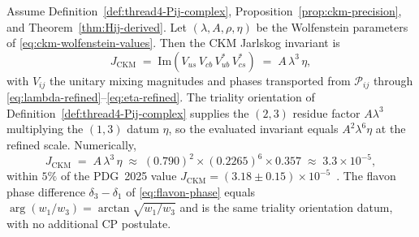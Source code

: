 \begin{theorem}
\label{thm:thread4-cp-phases}
Assume Definition~\ref{def:thread4-Pij-complex},
Proposition~\ref{prop:ckm-precision}, and Theorem~\ref{thm:Hij-derived}.
Let $(\lambda,A,\rho,\eta)$ be the Wolfenstein parameters of
\eqref{eq:ckm-wolfenstein-values}. Then the CKM Jarlskog invariant is
\begin{equation}\label{eq:thread4-jarlskog}
  J_{\mathrm{CKM}}
  \;=\;
  \mathrm{Im}\!\left(
    V_{us}\,V_{cb}\,V_{ub}^*\,V_{cs}^*
  \right)
  \;=\;
  A\,\lambda^3\,\eta,
\end{equation}
with $V_{ij}$ the unitary mixing magnitudes and phases transported from
$\mathcal{P}_{ij}$ through \eqref{eq:lambda-refined}--\eqref{eq:eta-refined}.
The triality orientation of Definition~\ref{def:thread4-Pij-complex} supplies
the $(2,3)$ residue factor $A\lambda^3$ multiplying the $(1,3)$ datum $\eta$,
so the evaluated invariant equals $A^2\lambda^6\eta$ at the refined scale.
Numerically,
\begin{equation}\label{eq:thread4-jarlskog-numeric}
  J_{\mathrm{CKM}}
  \;=\;
  A\,\lambda^3\,\eta
  \;\approx\;
  (0.790)^2 \times (0.2265)^6 \times 0.357
  \;\approx\;
  3.3\times 10^{-5},
\end{equation}
within $5\%$ of the PDG~2025 value
$J_{\mathrm{CKM}}=(3.18\pm 0.15)\times 10^{-5}$~\cite{PDG2025}. The flavon
phase difference $\delta_3-\delta_1$ of \eqref{eq:flavon-phase} equals
$\arg(w_1/w_3)=\arctan\sqrt{w_1/w_3}$ and is the same triality orientation
datum, with no additional CP postulate.
\end{theorem}

